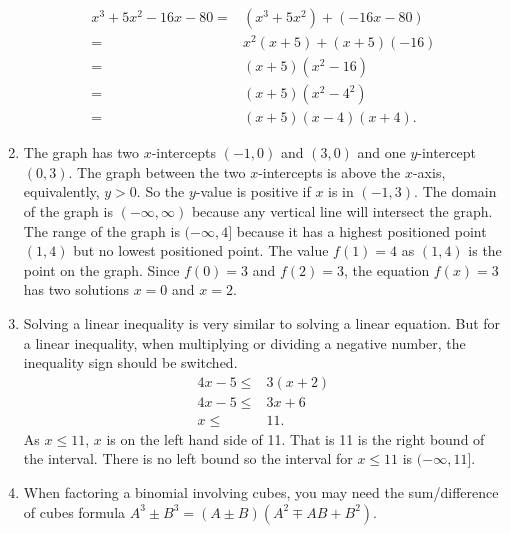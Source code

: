 \documentclass[
  12pt]{article}
\begin{document}
\begin{enumerate}
  \[
   \begin{aligned}
   x^3+5x^2-16x-80=&(x^3+5x^2)+(-16x-80)\\
   =&x^2(x+5)+(x+5)(-16)\\
   =&(x+5)(x^2-16)\\
   =&(x+5)(x^2-4^2)\\
   =&(x+5)(x-4)(x+4).
   \end{aligned}
   \]
\item
  The graph has two \(x\)-intercepts \((-1, 0)\) and \((3,0)\) and one
  \(y\)-intercept \((0, 3)\). The graph between the two \(x\)-intercepts
  is above the \(x\)-axis, equivalently, \(y>0\). So the \(y\)-value is
  positive if \(x\) is in \((-1,3)\). The domain of the graph is
  \((-\infty, \infty)\) because any vertical line will intersect the
  graph. The range of the graph is \((-\infty, 4]\) because it has a
  highest positioned point \((1, 4)\) but no lowest positioned point.
  The value \(f(1)=4\) as \((1, 4)\) is the point on the graph. Since
  \(f(0)=3\) and \(f(2)=3\), the equation \(f(x)=3\) has two solutions
  \(x=0\) and \(x=2\).
\item
  Solving a linear inequality is very similar to solving a linear
  equation. But for a linear inequality, when multiplying or dividing a
  negative number, the inequality sign should be switched. \[
   \begin{aligned}
   4x-5\leq& 3(x+2)\\
   4x-5\leq& 3x+6\\
   x\leq&11.
   \end{aligned}
   \] As \(x\leq 11\), \(x\) is on the left hand side of 11. That is 11
  is the right bound of the interval. There is no left bound so the
  interval for \(x\le 11\) is \((-\infty, 11]\).
\item
  When factoring a binomial involving cubes, you may need the
  sum/difference of cubes formula
  \(A^3\pm B^3=(A\pm B)(A^2\mp AB+B^2)\).


\end{enumerate}
\end{document}
